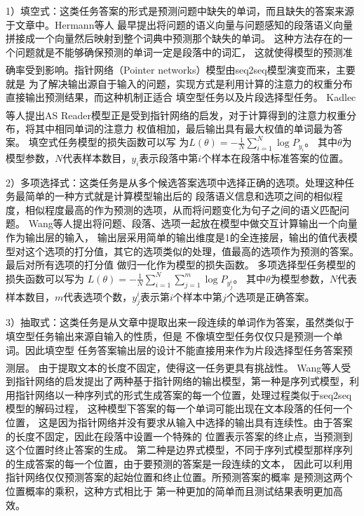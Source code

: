 \documentclass{article}
\newcommand{\upcite}[1]{\textsuperscript{\textsuperscript{\cite{#1}}}}
\begin{document}
1）填空式：这类任务答案的形式是预测问题中缺失的单词，而且缺失的答案来源于文章中。Hermann等人\cite{Hermann}
最早提出将问题的语义向量与问题感知的段落语义向量拼接成一个向量然后映射到整个词典中预测那个缺失的单词。
这种方法存在的一个问题就是不能够确保预测的单词一定是段落中的词汇，
这就使得模型的预测准确率受到影响。指针网络（Pointer networks\upcite{Ptr}）模型由seq2seq模型演变而来，主要就是
为了解决输出源自于输入的问题，实现方式是利用计算的注意力的权重分布直接输出预测结果，而这种机制正适合
填空型任务以及片段选择型任务。
Kadlec等人\upcite{ASR}提出AS Reader模型正是受到指针网络的启发，对于计算得到的注意力权重分布，将其中相同单词的注意力
权值相加，最后输出具有最大权值的单词最为答案。
填空式任务模型的损失函数可以写
为$L(\theta)=-\displaystyle\frac{1}{N}\sum_{i=1}^{N}\log P_{y_i}$。
其中$\theta$为模型参数，$N$代表样本数目，$y_i$表示段落中第$i$个样本在段落中标准答案的位置。

2）多项选择式：这类任务是从多个候选答案选项中选择正确的选项。处理这种任务最简单的一种方式就是计算模型输出后的
段落语义信息和选项之间的相似程度，相似程度最高的作为预测的选项，从而将问题变化为句子之间的语义匹配问题。
Wang等人\cite{Co-matching}提出将问题、段落、选项一起放在模型中做交互计算输出一个向量作为输出层的输入，
输出层采用简单的输出维度是1的全连接层，输出的值代表模型对这个选项的打分值，其它的选项类似的处理，值最高的选项作为预测的答案。
最后对所有选项的打分值
做归一化作为模型的损失函数。
多项选择型任务模型的损失函数可以写为
$L(\theta)=-\displaystyle\frac{1}{N}\sum_{i=1}^{N}\sum_{j=1}^{m}\log P_{y_{j}^i}$。
其中$\theta$为模型参数，$N$代表样本数目，$m$代表选项个数，$y_{j}^i$表示第$i$个样本中第$j$个选项是正确答案。

3）抽取式：这类任务是从文章中提取出来一段连续的单词作为答案，虽然类似于填空型任务输出来源自输入的性质，但是
不像填空型任务仅仅只是预测一个单词。因此填空型
任务答案输出层的设计不能直接用来作为片段选择型任务答案预测层。
由于提取文本的长度不固定，使得这一任务更具有挑战性。
Wang等人\upcite{MatchLSTM}受到指针网络的启发提出了两种基于指针网络的输出模型，第一种是序列式模型，利用指针网络以一种序列式的形式生成答案的每一个位置，处理过程类似于seq2seq模型的解码过程，
这种模型下答案的每一个单词可能出现在文本段落的任何一个位置，
这是因为指针网络并没有要求从输入中选择的输出具有连续性。由于答案的长度不固定，因此在段落中设置一个特殊的
位置表示答案的终止点，当预测到这个位置时终止答案的生成。
第二种是边界式模型，不同于序列式模型那样序列的生成答案的每一个位置，由于要预测的答案是一段连续的文本，
因此可以利用指针网络仅仅预测答案的起始位置和终止位置。所预测答案的概率
是预测这两个位置概率的乘积，这种方式相比于
第一种更加的简单而且测试结果表明更加高效。
\end{document}
